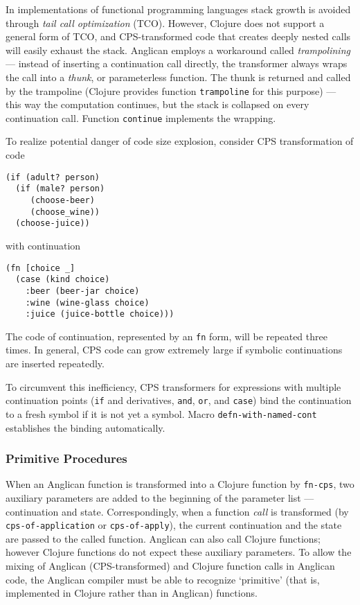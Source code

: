 \documentclass[a4paper]{article}
\begin{document}
In implementations of functional programming languages stack
growth is avoided through \textit{tail call optimization} (TCO).
However, Clojure does not support a general form of TCO, and
CPS-transformed code that creates deeply nested calls will
easily exhaust the stack. Anglican employs a workaround called
\textit{trampolining} --- instead of inserting a continuation
call directly, the transformer always wraps the call into a
\textit{thunk}, or parameterless function. The thunk is returned
and called by the trampoline (Clojure provides function
\texttt{trampoline} for this purpose) --- this way the
computation continues, but the stack is collapsed on every
continuation call. Function \texttt{continue} implements the
wrapping.

To realize potential danger of code size explosion, consider
CPS transformation of code
\begin{lstlisting}[frame=single,language=Anglican, basicstyle=\scriptsize\ttfamily, showstringspaces=false]
(if (adult? person)
  (if (male? person)
	 (choose-beer)
	 (choose_wine))
  (choose-juice))
\end{lstlisting}
with continuation 
\begin{lstlisting}[frame=single,language=Anglican, basicstyle=\scriptsize\ttfamily, showstringspaces=false]
(fn [choice _]
  (case (kind choice)
    :beer (beer-jar choice)
    :wine (wine-glass choice)
    :juice (juice-bottle choice)))
\end{lstlisting}
The code of continuation, represented by an \texttt{fn} form, will be
repeated three times. In general, CPS code can grow extremely
large if symbolic continuations are inserted repeatedly.

To circumvent this inefficiency, CPS transformers for
expressions with multiple continuation points (\texttt{if} and
derivatives, \texttt{and}, \texttt{or}, and \texttt{case}) bind
the continuation to a fresh symbol if it is not yet a symbol.
Macro \texttt{defn-with-named-cont} establishes the binding
automatically.

\subsubsection{Primitive Procedures}

When an Anglican function is transformed into a Clojure function
by \texttt{fn-cps}, two auxiliary parameters are added to the
beginning of the parameter list --- continuation and state.
Correspondingly, when a function \textit{call} is transformed
(by \texttt{cps-of-application} or \texttt{cps-of-apply}), the
current continuation and the state are passed to the called
function. Anglican can also call Clojure functions; however
Clojure functions do not expect these auxiliary parameters.
To allow the mixing of Anglican (CPS-transformed) and Clojure
function calls in Anglican code, the Anglican compiler must be
able to recognize `primitive' (that is, implemented in Clojure
rather than in Anglican) functions. 
\end{document}
